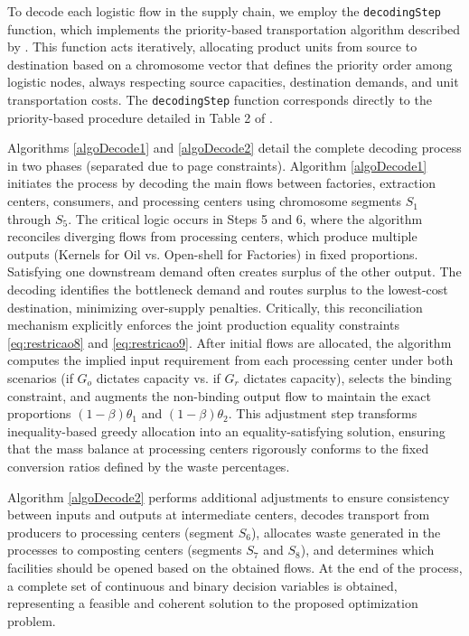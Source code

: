 \documentclass[preprint,12pt,authoryear]{elsarticle}
\begin{document}
To decode each logistic flow in the supply chain, we employ the \texttt{decodingStep} function, which implements the priority-based transportation algorithm described 
by \citet{gen2006}. This function acts iteratively, allocating product units from source to destination based on a chromosome vector that defines the priority order 
among logistic nodes, always respecting source capacities, destination demands, and unit transportation costs. The \texttt{decodingStep} function corresponds directly 
to the priority-based procedure detailed in Table 2 of \citet{gen2006}.

Algorithms \ref{algoDecode1} and \ref{algoDecode2} detail the complete decoding process in two phases (separated due to page constraints). Algorithm \ref{algoDecode1} 
initiates the process by decoding the main flows between factories, extraction centers, consumers, and processing centers using chromosome segments $S_1$ through $S_5$. 
The critical logic occurs in Steps 5 and 6, where the algorithm reconciles diverging flows from processing centers, which produce multiple outputs (Kernels for Oil vs. 
Open-shell for Factories) in fixed proportions. Satisfying one downstream demand often creates surplus of the other output. The decoding identifies the bottleneck demand 
and routes surplus to the lowest-cost destination, minimizing over-supply penalties. Critically, this reconciliation mechanism explicitly enforces the joint production 
equality constraints \eqref{eq:restricao8} and \eqref{eq:restricao9}. After initial flows are allocated, the algorithm computes the implied input requirement from each 
processing center under both scenarios (if $G_o$ dictates capacity vs. if $G_r$ dictates capacity), selects the binding constraint, and augments the non-binding output 
flow to maintain the exact proportions $(1-\beta)\theta_1$ and $(1-\beta)\theta_2$. This adjustment step transforms inequality-based greedy allocation into an equality-satisfying 
solution, ensuring that the mass balance at processing centers rigorously conforms to the fixed conversion ratios defined by the waste percentages.

Algorithm \ref{algoDecode2} performs additional adjustments to ensure consistency between inputs and outputs at intermediate centers, decodes transport from producers 
to processing centers (segment $S_6$), allocates waste generated in the processes to composting centers (segments $S_7$ and $S_8$), and determines which facilities 
should be opened based on the obtained flows. At the end of the process, a complete set of continuous and binary decision variables is obtained, representing a feasible 
and coherent solution to the proposed optimization problem.
\end{document}
